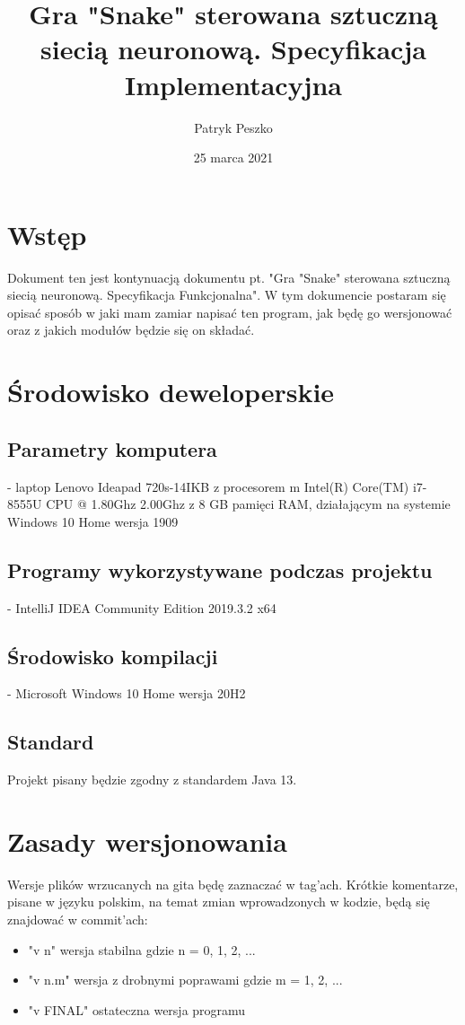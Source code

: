 \documentclass[12pt]{article}
\title{Gra "Snake" sterowana sztuczną siecią neuronową. Specyfikacja Implementacyjna}
\author{Patryk Peszko}
\date{25 marca 2021}
\begin{document}
	\begin{titlepage}
		\clearpage\maketitle\thispagestyle{empty}
		\maketitle
	\end{titlepage}
	
	\tableofcontents
	\newpage
	\section {Wstęp}
		Dokument ten jest kontynuacją dokumentu pt. "Gra "Snake" sterowana sztuczną siecią neuronową. Specyfikacja Funkcjonalna". W tym dokumencie postaram się opisać sposób w jaki mam zamiar napisać ten program, jak będę go wersjonować oraz z jakich modułów będzie się on składać.
	
	\section {Środowisko deweloperskie}
		\subsection{Parametry komputera}
			- laptop Lenovo Ideapad 720s-14IKB z procesorem m Intel(R) Core(TM) i7-8555U CPU @ 1.80Ghz 2.00Ghz z 8 GB pamięci RAM, działającym na systemie Windows 10 Home wersja 1909
			
		\subsection{Programy wykorzystywane podczas projektu}
			- IntelliJ IDEA Community Edition 2019.3.2 x64 
			
		\subsection{Środowisko kompilacji}
			- Microsoft Windows 10 Home wersja 20H2
			
		\subsection{Standard}
			Projekt pisany będzie zgodny z standardem Java 13.
		
	\section {Zasady wersjonowania}
		Wersje plików wrzucanych na gita będę zaznaczać w tag'ach. Krótkie komentarze, pisane w języku polskim, na temat zmian wprowadzonych w kodzie, będą się znajdować w commit'ach:
		\begin{itemize}
			\item "v n" wersja stabilna gdzie n = { 0, 1, 2, ...}
			\item "v n.m" wersja z drobnymi poprawami gdzie m = { 1, 2, ...}
			\item "v FINAL" ostateczna wersja programu				
		\end{itemize}
	
\end{document}
